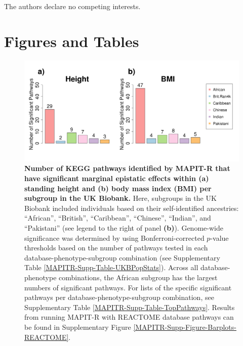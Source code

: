 \documentclass[10pt]{article}
\begin{document}
The authors declare no competing interests.


\clearpage
\newpage

\section*{Figures and Tables}

\begin{figure}[htb]
\centering
\includegraphics[width=\textwidth]{Images/Main/Figure1.png}
\caption{\textbf{Number of KEGG pathways identified by MAPIT-R that have significant marginal epistatic effects within (a) standing height and (b) body mass index (BMI) per subgroup in the UK Biobank.} Here, subgroups in the UK Biobank included individuals based on their self-identified ancestries: ``African'', ``British'', ``Caribbean'', ``Chinese'', ``Indian'', and ``Pakistani'' (see legend to the right of panel \textbf{(b)}). Genome-wide significance was determined by using Bonferroni-corrected $p$-value thresholds based on the number of pathways tested in each database-phenotype-subgroup combination (see Supplementary Table \ref{MAPITR-Supp-Table-UKBPopStats}). Across all database-phenotype combinations, the African subgroup has the largest numbers of significant pathways. For lists of the specific significant pathways per database-phenotype-subgroup combination, see Supplementary Table \ref{MAPITR-Supp-Table-TopPathways}. Results from running MAPIT-R with REACTOME database pathways can be found in Supplementary Figure \ref{MAPITR-Supp-Figure-Barplots-REACTOME}.}
\label{MAPITR-Main-Figure-Barplots-KEGG}
\end{figure}

\end{document}
